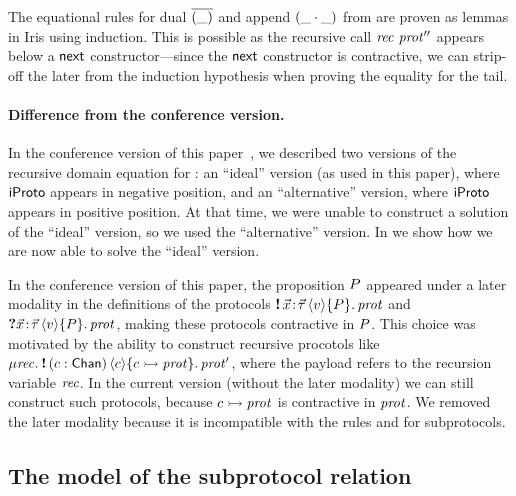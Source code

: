 The equational rules for dual $\overline{(\_)}$ and append $(\_ \cdot \_)$ from
 are proven as lemmas in Iris using  induction.
This is possible as the recursive call $\mathit{rec}\ \mathit{prot}''$ appears below a
$\textsf{\upshape next}$ constructor---since the $\textsf{\upshape next}$ constructor is contractive, we can
strip-off the later from the induction hypothesis when proving the equality for
the tail.

\paragraph{\bf Difference from the conference version.}

In the conference version of this paper~\cite{DBLP:journals/pacmpl/HinrichsenBK20},
we described two versions of the recursive domain equation for \pname:
an ``ideal'' version (as used in this paper), where $\mathsf{iProto}$ appears in negative
position, and an ``alternative'' version, where $\mathsf{iProto}$ appears in positive
position.
At that time, we were unable to construct a solution of the ``ideal''
version, so we used the ``alternative'' version.
In  we show how we are now able to solve the ``ideal''
version.

In the conference version of this paper, the proposition $P$
appeared under a later modality in the definitions of the protocols
$\sendprot{\xdots}{\val}{\iprop}{\prot}$ and $\recvprot{\xdots}{\val}{\iprop}{\prot}$,
making these protocols contractive in $P$.
This choice was motivated by the ability to construct recursive procotols like
$\MU \recvar. \sendprot{(\chan:\Chan)}{\chan}{\interp \chan \prot}{\prot'}$,
where the payload refers to the recursion variable $\mathit{rec}$.
In the current version (without the later modality) we can still construct such
protocols, because $c \rightarrowtail \mathit{prot}$ is contractive in $\mathit{prot}$.
We removed the later modality because it is incompatible with the rules 
and  for subprotocols.

\subsection{The model of the subprotocol relation}
\label{sec:subprotocol_model}

